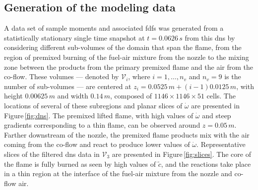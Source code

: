 \documentclass[review]{elsarticle}
\newcommand{\wt}[1]{\widetilde{#1}}
\begin{document}
\subsection{Generation of the modeling data}\label{sec:gen}

A data set of sample moments and associated \glspl{fdf} was generated
from a statistically stationary single time snapshot at
$t=0.0626\,\unit{s}$ from this \gls{dns} by considering different
sub-volumes of the domain that span the flame, from the region of
premixed burning of the fuel-air mixture from the nozzle to the mixing
zone between the products from the primary premixed flame and the air
from the co-flow. These volumes --- denoted by $\mathcal{V}_i$, where
$i=1, \dots, n_v$ and $n_v = 9$ is the number of sub-volumes --- are
centered at $z_i = 0.0525\,\unit{m} + (i-1) 0.0125 \,\unit{m}$, with
height $0.00625\,\unit{m}$ and width $0.14\,\unit{m}$, composed of
$1146 \times 1146 \times 51$ cells. The locations of several of these
subregions and planar slices of $\dot{\omega}$ are presented in
Figure\,\ref{fig:dns}. The premixed lifted flame, with high values of
$\dot{\omega}$ and steep gradients corresponding to a thin flame, can
be observed around $z=0.05\,\unit{m}$. Farther downstream of the
nozzle, the premixed flame products mix with the air coming from the
co-flow and react to produce lower values of
$\dot{\omega}$. Representative slices of the filtered \gls{dns} data
in $\mathcal{V}_3$ are presented in Figure\,\ref{fig:slices}. The core
of the flame is fully burned as seen by high values of $\wt{c}$, and
the reactions take place in a thin region at the interface of the
fuel-air mixture from the nozzle and co-flow air.
\end{document}
